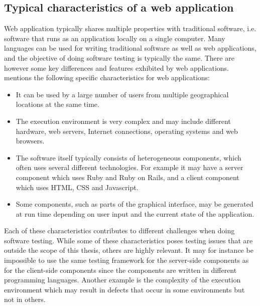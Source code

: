 \label{sec:testing_web}

\subsection{Typical characteristics of a web application}

Web application typically shares multiple properties with traditional
software, i.e. software that runs as an application locally on a single
computer. Many languages can be used for writing traditional software as
well as web applications, and the objective of doing software testing is
typically the same. There are however some key differences and features
exhibited by web applications. \citet{book:web} mentions the following
specific characteristics for web applications:\\

\begin{itemize}

\item It can be used by a large number of users from multiple
geographical locations at the same time.

\item The execution environment is very complex and may include
different hardware, web servers, Internet connections, operating systems
and web browsers.

\item The software itself typically consists of heterogeneous
components, which often uses several different technologies. For example
it may have a server component which uses Ruby and Ruby on Rails, and a
client component which uses HTML, CSS and Javascript.

\item Some components, such as parts of the graphical interface, may be
generated at run time depending on user input and the current state of
the application.

\end{itemize}

Each of these characteristics contributes to different challenges when
doing software testing. While some of these characteristics poses
testing issues that are outside the scope of this thesis, others are
highly relevant. It may for instance be impossible to use the same
testing framework for the server-side components as for the client-side
components since the components are written in different programming
languages. Another example is the complexity of the execution
environment which may result in defects that occur in some environments
but not in others.\\


